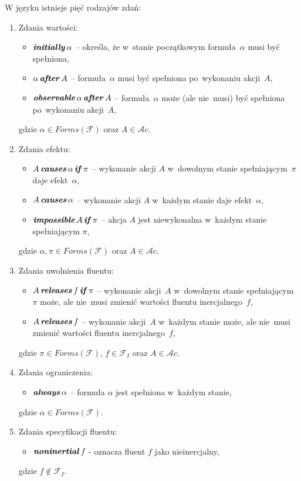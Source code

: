 \documentclass[11pt,a4paper]{article}
\DeclareMathOperator{\Initially}{\textbf{\textit{initially}}}
\DeclareMathOperator{\After}{\textbf{\textit{after}}}
\DeclareMathOperator{\Observable}{\textbf{\textit{observable}}}
\DeclareMathOperator{\Causes}{\textbf{\textit{causes}}}
\DeclareMathOperator{\If}{\textbf{\textit{if}}}
\DeclareMathOperator{\Impossible}{\textbf{\textit{impossible}}}
\DeclareMathOperator{\Releases}{\textbf{\textit{releases}}}
\DeclareMathOperator{\Always}{\textbf{\textit{always}}}
\DeclareMathOperator{\Noninertial}{\textbf{\textit{noninertial}}}
\begin{document}
W języku istnieje pięć rodzajów zdań:
\begin{enumerate}
    \item Zdania wartości:
    \begin{itemize}
        \item $\Initially \alpha$ -- określa, że w~stanie początkowym formuła~$\alpha$ musi być spełniona,
        \item $\alpha \After A$ -- formuła~$\alpha$ musi być spełniona po~wykonaniu akcji~$A$,
        \item $\Observable \alpha \After A$ -- formuła~$\alpha$ może (ale nie~musi) być spełniona po~wykonaniu akcji~$A$,
    \end{itemize}
        
    gdzie $\alpha \in Forms(\mathcal{F})$ oraz $A \in \mathcal{A}c$.
    
    \item Zdania efektu:
    \begin{itemize}
        \item $A \Causes \alpha \If \pi$ -- wykonanie akcji $A$ w~dowolnym stanie spełniającym~$\pi$ daje efekt~$\alpha$,
        \item $A \Causes \alpha$ -- wykonanie akcji $A$ w~każdym stanie daje efekt~$\alpha$,
        \item $\Impossible A \If \pi$ -- akcja $A$ jest niewykonalna w~każdym stanie spełniającym $\pi$,
    \end{itemize}
    
    gdzie $\alpha, \pi \in Forms(\mathcal{F})$ oraz $A \in \mathcal{A}c$.
    
    \item Zdania uwolnienia fluentu:
    \begin{itemize}
        \item $A \Releases f \If \pi$ -- wykonanie akcji~$A$ w~dowolnym stanie spełniającym~$\pi$ może, ale nie~musi zmienić wartości fluentu inercjalnego~$f$,
        \item $A \Releases f$ -- wykonanie akcji~$A$ w~każdym stanie może, ale nie~musi zmienić wartości fluentu inercjalnego~$f$,
    \end{itemize}
    
    gdzie $\pi \in Forms(\mathcal{F})$, $f \in \mathcal{F}_I$ oraz $A \in \mathcal{A}c$.
    
    \item Zdania ograniczenia:
    \begin{itemize}
        \item $\Always \alpha$ -- formuła $\alpha$ jest spełniona w~każdym stanie,
    \end{itemize}
    gdzie $\alpha \in Forms(\mathcal{F})$.
    
    \item Zdania specyfikacji fluentu:
    \begin{itemize}
        \item $\Noninertial f$ - oznacza fluent $f$ jako nieinercjalny,
    \end{itemize}
    gdzie $f \notin \mathcal{F}_I$.
    
\end{enumerate}
\end{document}

